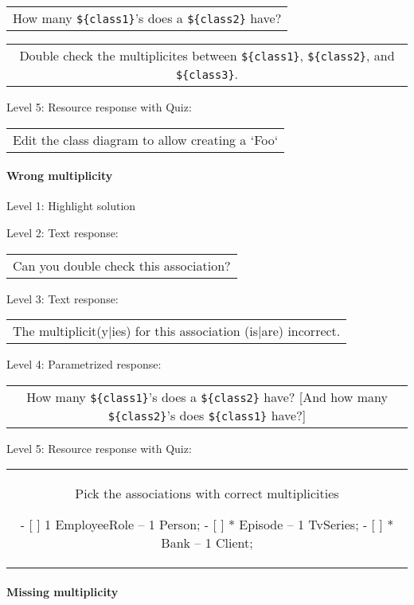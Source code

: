 \begin{tabular}{|c}
How many \verb|${class1}|'s does a \verb|${class2}| have?
\end{tabular} \medskip

\begin{tabular}{|c}
Double check the multiplicites between \verb|${class1}|, \verb|${class2}|, and \verb|${class3}|.
\end{tabular} \medskip

\noindent Level 5: Resource response with Quiz:

\begin{tabular}{|c}
Edit the class diagram to allow creating a `Foo`
\end{tabular} \medskip


\paragraph{Wrong multiplicity}

\noindent Level 1: Highlight solution \medskip

\noindent Level 2: Text response: \medskip

\begin{tabular}{|c}
Can you double check this association?
\end{tabular} \medskip

\noindent Level 3: Text response: \medskip

\begin{tabular}{|c}
The multiplicit(y|ies) for this association (is|are) incorrect.
\end{tabular} \medskip

\noindent Level 4: Parametrized response: \medskip

\begin{tabular}{|c}
How many \verb|${class1}|'s does a \verb|${class2}| have? [And how many \verb|${class2}|'s does \verb|${class1}| have?]
\end{tabular} \medskip

\noindent Level 5: Resource response with Quiz:

\begin{tabular}{|c}
Pick the associations with correct multiplicities

- [ ] 1 EmployeeRole -- 1 Person;
- [ ] * Episode -- 1 TvSeries;
- [ ] * Bank -- 1 Client;
\end{tabular} \medskip


\paragraph{Missing multiplicity}

